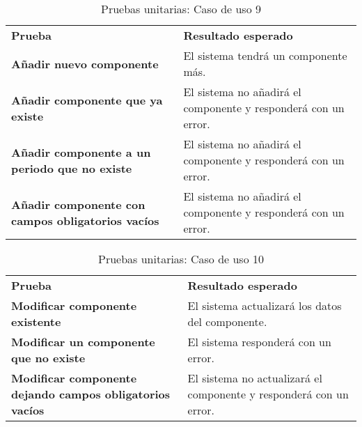 \begin{table}[H]
\vspace{-4mm}
  \centering
  \caption{Pruebas unitarias: Caso de uso 9}
    \begin{tabular}{p{13em}p{23em}}
    \toprule
    \rowcolor[rgb]{ .851,  .886,  .953} \multicolumn{2}{p{36em}}{\textbf{Caso de uso 9: Añadir componente}} \\ \midrule
    \rowcolor[rgb]{ .949,  .949,  .949} \textbf{Prueba} &  \textbf{Resultado esperado}\\ \midrule
    \textbf{Añadir nuevo componente} & El sistema tendrá un componente más. \\ \midrule
    \textbf{Añadir componente que ya existe} & El sistema no añadirá el componente y responderá con un error.  \\ \midrule
    \textbf{Añadir componente a un periodo que no existe} & El sistema no añadirá el componente y responderá con un error.  \\ \midrule
    \textbf{Añadir componente con campos obligatorios vacíos} & El sistema no añadirá el componente y responderá con un error. \\ \bottomrule
    \end{tabular}%
\end{table}%
\begin{table}[H]
\vspace{-4mm}
  \centering
  \caption{Pruebas unitarias: Caso de uso 10}
    \begin{tabular}{p{13em}p{23em}}
    \toprule
    \rowcolor[rgb]{ .851,  .886,  .953} \multicolumn{2}{p{36em}}{\textbf{Caso de uso 10: Modificar componente}} \\ \midrule
    \rowcolor[rgb]{ .949,  .949,  .949} \textbf{Prueba} &  \textbf{Resultado esperado}\\ \midrule
    \textbf{Modificar componente existente} & El sistema actualizará los datos del componente. \\ \midrule
    \textbf{Modificar un componente que no existe} & El sistema responderá con un error. \\ \midrule
    \textbf{Modificar componente dejando campos obligatorios vacíos} & El sistema no actualizará el componente y responderá con un error. \\ \bottomrule
    \end{tabular}%
\end{table}%
